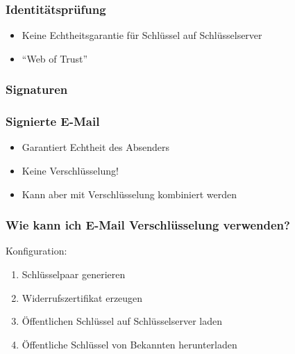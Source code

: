 \begin{frame}
  \frametitle{Identitätsprüfung}
  \begin{itemize}
    \item Keine Echtheitsgarantie für Schlüssel auf Schlüsselserver
    \item ``Web of Trust''
  \end{itemize}
  \center {}
\end{frame}

\begin{frame}
  \frametitle{Signaturen}
  \center {}
\end{frame}

\begin{frame}
  \frametitle{Signierte E-Mail}
  \begin{itemize}
    \item Garantiert Echtheit des Absenders
    \item Keine Verschlüsselung!
    \item Kann aber mit Verschlüsselung kombiniert werden
  \end{itemize}
\end{frame}

\begin{frame}
  \frametitle{Wie kann ich E-Mail Verschlüsselung verwenden?}
  
      Konfiguration:
      \begin{enumerate}
        \item Schlüsselpaar generieren
        \item Widerrufszertifikat erzeugen
        \item Öffentlichen Schlüssel auf Schlüsselserver laden
        \item Öffentliche Schlüssel von Bekannten herunterladen
      \end{enumerate}

\end{frame}
